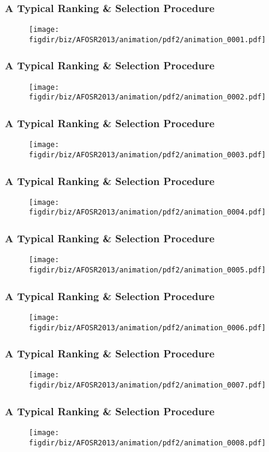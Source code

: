 \documentclass[13pt]{beamer}
\newcommand{\figdir}{../../fig}
\begin{document}
\begin{frame}\frametitle{A Typical Ranking \& Selection Procedure}\begin{figure}\texttt{[image: \\figdir/biz/AFOSR2013/animation/pdf2/animation\_0001.pdf]}\end{figure}\end{frame}
\begin{frame}\frametitle{A Typical Ranking \& Selection Procedure}\begin{figure}\texttt{[image: \\figdir/biz/AFOSR2013/animation/pdf2/animation\_0002.pdf]}\end{figure}\end{frame}
\begin{frame}\frametitle{A Typical Ranking \& Selection Procedure}\begin{figure}\texttt{[image: \\figdir/biz/AFOSR2013/animation/pdf2/animation\_0003.pdf]}\end{figure}\end{frame}
\begin{frame}\frametitle{A Typical Ranking \& Selection Procedure}\begin{figure}\texttt{[image: \\figdir/biz/AFOSR2013/animation/pdf2/animation\_0004.pdf]}\end{figure}\end{frame}
\begin{frame}\frametitle{A Typical Ranking \& Selection Procedure}\begin{figure}\texttt{[image: \\figdir/biz/AFOSR2013/animation/pdf2/animation\_0005.pdf]}\end{figure}\end{frame}
\begin{frame}\frametitle{A Typical Ranking \& Selection Procedure}\begin{figure}\texttt{[image: \\figdir/biz/AFOSR2013/animation/pdf2/animation\_0006.pdf]}\end{figure}\end{frame}
\begin{frame}\frametitle{A Typical Ranking \& Selection Procedure}\begin{figure}\texttt{[image: \\figdir/biz/AFOSR2013/animation/pdf2/animation\_0007.pdf]}\end{figure}\end{frame}
\begin{frame}\frametitle{A Typical Ranking \& Selection Procedure}\begin{figure}\texttt{[image: \\figdir/biz/AFOSR2013/animation/pdf2/animation\_0008.pdf]}\end{figure}\end{frame}
\end{document}
